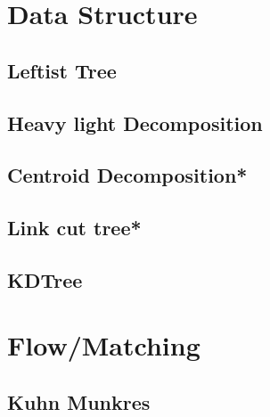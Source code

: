 \section{Data Structure}
\subsection{Leftist Tree}

\subsection{Heavy light Decomposition}

\subsection{Centroid Decomposition*} %

% 
% 
\subsection{Link cut tree*} %

\subsection{KDTree}



\section{Flow/Matching}
% 
\subsection{Kuhn Munkres}

